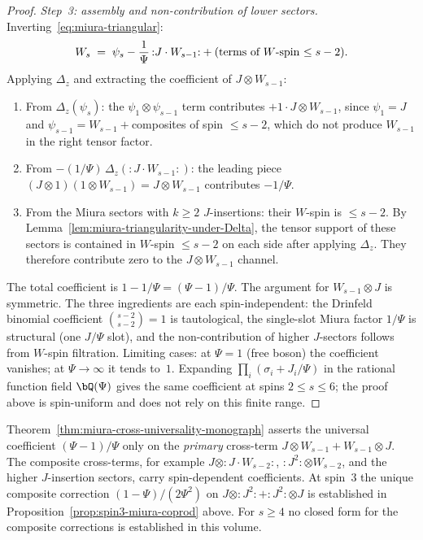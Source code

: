 \begin{proof}
\emph{Step~3: assembly and non-contribution of lower
sectors.}
Inverting~\eqref{eq:miura-triangular}:
\[
 W_s
 \;=\;
 \psi_s - \frac{1}{\Psi}\,{:}J \cdot W_{s-1}{:}
 + (\textup{terms of $W$-spin $\leq s-2$}).
\]
Applying $\Delta_z$ and extracting the coefficient of
$J \otimes W_{s-1}$:
\begin{enumerate}[label=\textup{(\roman*)}]
\item From $\Delta_z(\psi_s)$: the
 $\psi_1 \otimes \psi_{s-1}$ term contributes
 $+1 \cdot J \otimes W_{s-1}$, since
 $\psi_1 = J$ and
 $\psi_{s-1} = W_{s-1} + {}$composites of
 spin $\leq s - 2$, which do not produce $W_{s-1}$
 in the right tensor factor.
\item From $-(1/\Psi)\,\Delta_z({:}J \cdot W_{s-1}{:})$:
 the leading piece
 $(J \otimes 1)(1 \otimes W_{s-1})
 = J \otimes W_{s-1}$ contributes
 $-1/\Psi$.
\item From the Miura sectors with $k \geq 2$
 $J$-insertions: their $W$-spin is $\leq s - 2$.
 By Lemma~\ref{lem:miura-triangularity-under-Delta},
 the tensor support of these sectors is contained in
 $W$-spin $\leq s - 2$ on each side after applying
 $\Delta_z$.  They therefore contribute zero to the
 $J \otimes W_{s-1}$ channel.
\end{enumerate}
The total coefficient is $1 - 1/\Psi = (\Psi - 1)/\Psi$.
The argument for $W_{s-1} \otimes J$ is symmetric.
The three ingredients are each spin-independent: the
Drinfeld binomial coefficient $\binom{s-2}{s-2} = 1$
is tautological, the single-slot Miura factor $1/\Psi$ is
structural \textup{(}one $J/\Psi$ slot\textup{)},
and the non-contribution of higher $J$-sectors follows
from $W$-spin filtration.
Limiting cases: at $\Psi = 1$
\textup{(}free boson\textup{)} the coefficient vanishes;
at $\Psi \to \infty$ it tends to~$1$.
Expanding $\prod_i(\sigma_i+J_i/\Psi)$ in the rational function
field $\bQ(\Psi)$ gives the same coefficient at spins $2\leq s\leq6$;
the proof above is spin-uniform and does not rely on this finite range.
\end{proof}

\begin{remark}
\label{rem:miura-primary-vs-composite-scope-monograph}
Theorem~\textup{\ref{thm:miura-cross-universality-monograph}}
asserts the universal coefficient $(\Psi - 1)/\Psi$ only on the
\emph{primary} cross-term $J \otimes W_{s-1} + W_{s-1} \otimes J$.
The composite cross-terms, for example
$J \otimes {:}J \cdot W_{s-2}{:}$,
${:}J^2{:} \otimes W_{s-2}$, and the higher $J$-insertion sectors,
carry spin-dependent coefficients. At spin~$3$ the unique
composite correction
$(1 - \Psi)/(2\Psi^2)$ on $J \otimes {:}J^2{:} + {:}J^2{:} \otimes J$
is established in
Proposition~\textup{\ref{prop:spin3-miura-coprod}} above.
For $s \geq 4$ no closed form for the composite corrections is
established in this volume.
\end{remark}

